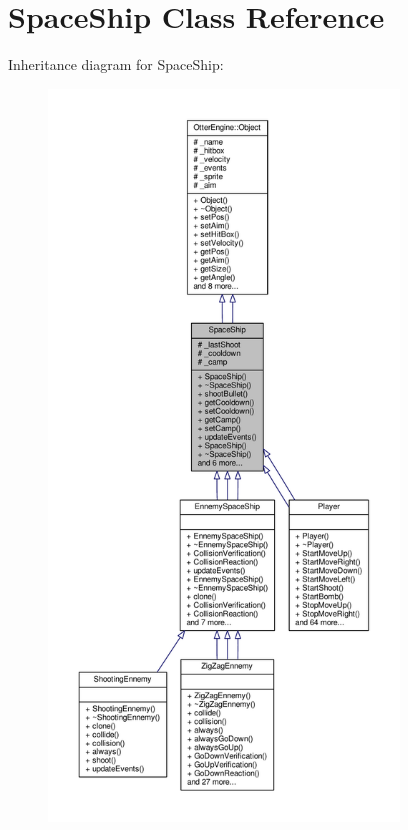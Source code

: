 \hypertarget{class_space_ship}{}\section{Space\+Ship Class Reference}
\label{class_space_ship}


Inheritance diagram for Space\+Ship\+:\nopagebreak
\begin{figure}[H]
\begin{center}
\leavevmode
\includegraphics[height=550pt]{de/dd8/class_space_ship__inherit__graph}
\end{center}
\end{figure}


